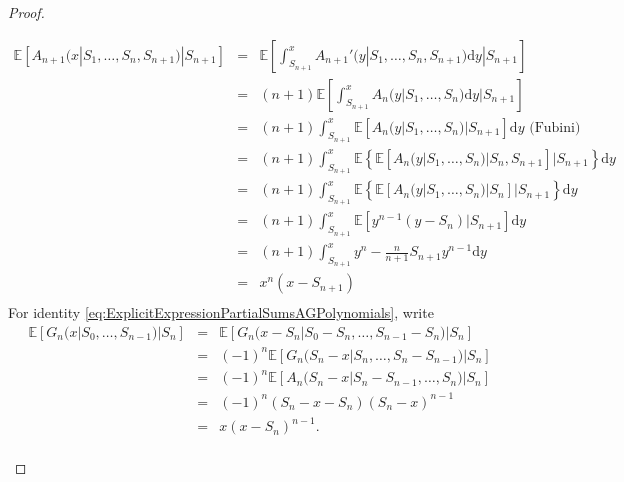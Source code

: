 \begin{proof}
\begin{enumerate}
\begin{eqnarray*}
\mathbb{E}\left[A_{n+1}(x|S_1,\ldots, S_n,S_{n+1})|S_{n+1}\right]&=&\mathbb{E}\left[\int_{S_{n+1}}^x A_{n+1}'(y|S_1,\ldots, S_n,S_{n+1})\text{d}y|S_{n+1}\right]\\
&=&(n+1)\mathbb{E}\left[\int_{S_{n+1}}^x A_{n}(y|S_1,\ldots, S_n)\text{d}y|S_{n+1}\right]\\
&=&(n+1)\int_{S_{n+1}}^x\mathbb{E}\left[A_{n}(y|S_1,\ldots, S_n)|S_{n+1}\right]\text{d}y\text{ (Fubini)}\\
&=&(n+1)\int_{S_{n+1}}^x\mathbb{E}\left\{\mathbb{E}\left[A_{n}(y|S_1,\ldots, S_n)|S_n,S_{n+1}\right]|S_{n+1}\right\}\text{d}y\\
&=&(n+1)\int_{S_{n+1}}^x\mathbb{E}\left\{\mathbb{E}\left[A_{n}(y|S_1,\ldots, S_n)|S_n\right]|S_{n+1}\right\}\text{d}y\\
&=&(n+1)\int_{S_{n+1}}^x\mathbb{E}\left[y^{n-1}(y-S_n)|S_{n+1}\right]\text{d}y\\
&=&(n+1)\int_{S_{n+1}}^xy^n-\frac{n}{n+1}S_{n+1}y^{n-1} \text{d}y\\
&=&x^n(x-S_{n+1})\\
\end{eqnarray*}
For identity \eqref{eq:ExplicitExpressionPartialSumsAGPolynomials}, write 
\begin{eqnarray*}
\mathbb{E}\left[G_{n}(x|S_0,\ldots, S_{n-1})|S_{n}\right]&=&\mathbb{E}\left[G_{n}(x-S_n|S_0 - S_n,\ldots, S_{n-1}-S_n)|S_{n}\right]\\
&=&(-1)^n\mathbb{E}\left[G_{n}(S_n-x|S_n,\ldots, S_{n}-S_{n-1})|S_{n}\right]\\
&=&(-1)^n\mathbb{E}\left[A_{n}(S_n-x|S_{n}-S_{n-1},\ldots, S_n)|S_{n}\right]\\
&=&(-1)^n(S_n-x -S_n)(S_n-x)^{n-1}\\
&=&x(x-S_n)^{n-1}.\\
\end{eqnarray*}
\end{enumerate}
\end{proof}

